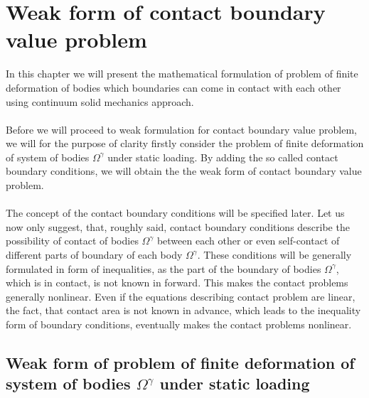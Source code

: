 \documentclass{article}
\begin{document}
\section{Weak form of contact boundary value problem}
In this chapter we will present the mathematical formulation of problem of finite deformation of bodies which boundaries can come in contact with each other using continuum solid mechanics approach.
\\
\\
Before we will proceed to weak formulation for contact boundary value problem, we will for the purpose of clarity firstly consider the problem of finite deformation of system of bodies $ \Omega^{\gamma} $ under static loading. By adding the so called contact boundary conditions, we will obtain the the weak form of contact boundary value problem.
\\
\\
The concept of the contact boundary conditions will be specified later. Let us now only suggest, that, roughly said, contact boundary conditions describe the possibility of contact of bodies $ \Omega^{\gamma} $ between each other or even self-contact of different parts of boundary of each body $ \Omega^{\gamma} $. These conditions will be generally formulated in form of inequalities, as the part of the boundary of bodies $ \Omega^{\gamma} $, which is in contact, is not known in forward. This makes the contact problems generally nonlinear. Even if the equations describing contact problem are linear, the fact, that contact area is not known in advance, which leads to the inequality form of boundary conditions, eventually makes the contact problems nonlinear.   
\subsection{Weak form of problem of finite deformation of system of bodies $ \Omega^{\gamma} $ under static loading}
  
\end{document}
